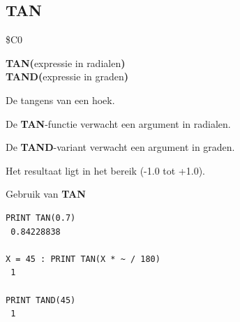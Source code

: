\subsection{TAN}
\begin{description}[leftmargin=2cm,style=nextline]
\item [Token:]    \$C0

\item [Formaat:]   {\bf TAN(}expressie in radialen{\bf )} \\                 {\bf TAND(}expressie in graden{\bf )}

\item [Retourneert:]  De tangens van een hoek.

                  De {\bf TAN}-functie verwacht een argument in radialen.

                  De {\bf TAND}-variant verwacht een argument in graden.

                  Het resultaat ligt in het bereik (-1.0 tot +1.0).

\item [Voorbeeld:]  Gebruik van {\bf TAN}

\begin{tcolorbox}[colback=black,coltext=white]
\verbatimfont{\codefont}
\begin{verbatim}
PRINT TAN(0.7)
 0.84228838

X = 45 : PRINT TAN(X * ~ / 180)
 1

PRINT TAND(45)
 1
\end{verbatim}
\end{tcolorbox}
\end{description}


\newpage
